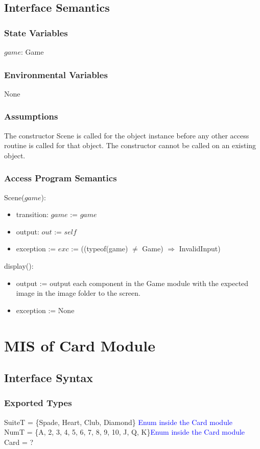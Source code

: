 \documentclass[12pt, titlepage]{article}
\begin{document}
\subsection{Interface Semantics}
\subsubsection{State Variables}
$game$: Game

\subsubsection{Environmental Variables}
None
\subsubsection{Assumptions}
The constructor Scene is called for the object instance before any other access routine is called for that object. The constructor cannot be called on an existing object.

\subsubsection{Access Program Semantics}
Scene($game$):
\begin{itemize}
    \item transition: $game$ := $game$
    \item output: $out$ := $self$
    \item exception := $exc$ := ((typeof(game) $\neq$ Game) $\Rightarrow$ InvalidInput)
\end{itemize}

display():
\begin{itemize}
    \item output := output each component in the Game module with the expected image in the image folder to the screen.
    \item exception := None
\end{itemize}

\section{MIS of Card Module}
\subsection{Interface Syntax}
\subsubsection{Exported Types}
SuiteT = \{Spade, Heart, Club, Diamond\} \textcolor{blue}{Enum inside the Card module}\\
NumT = \{A, 2, 3, 4, 5, 6, 7, 8, 9, 10, J, Q, K\}\textcolor{blue}{Enum inside the Card module}\\
Card = ?
\end{document}
